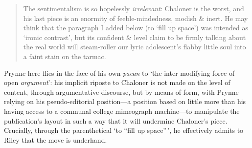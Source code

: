 \documentclass[]{article}
\begin{document}
\begin{quote}
The sentimentalism is so hopelessly \emph{irrelevant}: Chaloner is the
worst, and his last piece is an enormity of feeble-mindedness, modish \&
inert. He may think that the paragraph I added below (to `fill up
space') was intended as `ironic contrast', but its confident \& level
claim to be firmly talking about the real world will steam-roller our
lyric adolescent's flabby little soul into a faint stain on the tarmac.
\end{quote}

\noindent Prynne here flies in the face of his own \emph{paean} to `the
inter-modifying force of open \emph{argument}': his implicit riposte to
Chaloner is not made on the level of content, through argumentative
discourse, but by means of form, with Prynne relying on his
pseudo-editorial position---a position based on little more than his
having access to a communal college mimeograph machine---to manipulate
the publication's layout in such a way that it will undermine Chaloner's
piece. Crucially, through the parenthetical `to ``fill up space''\,', he
effectively admits to Riley that the move is underhand.
\end{document}
